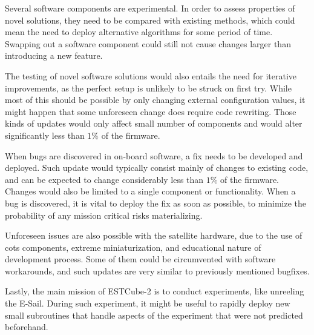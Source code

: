 Several software components are experimental. In order to assess properties of novel solutions, they need to be compared with existing methods, which could mean the need to deploy alternative algorithms for some period of time. Swapping out a software component could still not cause changes larger than introducing a new feature.

The testing of novel software solutions would also entails the need for iterative improvements, as the perfect setup is unlikely to be struck on first try. While most of this should be possible by only changing external configuration values, it might happen that some unforeseen change does require code rewriting. Those kinds of updates would only affect small number of components and would alter significantly less than $1\%$ of the firmware.

When bugs are discovered in on-board software, a fix needs to be developed and deployed. Such update would typically consist mainly of changes to existing code, and can be expected to change considerably less than $1\%$ of the firmware. Changes would also be limited to a single component or functionality. When a bug is discovered, it is vital to deploy the fix as soon as possible, to minimize the probability of any mission critical risks materializing.

Unforeseen issues are also possible with the satellite hardware, due to the use of \gls{cots} components, extreme miniaturization, and educational nature of development process. Some of them could be circumvented with software workarounds, and such updates are very similar to previously mentioned bugfixes.

Lastly, the main mission of ESTCube-2 is to conduct experiments, like unreeling the E-Sail. During such experiment, it might be useful to rapidly deploy new small subroutines that handle aspects of the experiment that were not predicted beforehand.